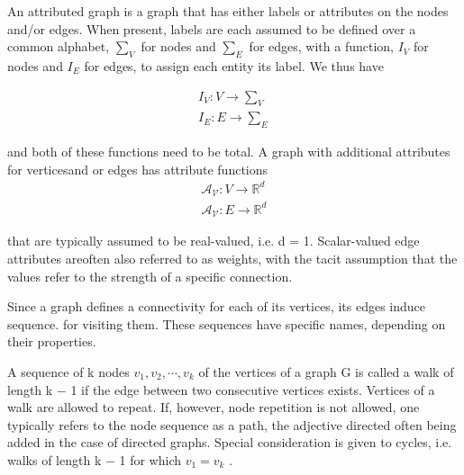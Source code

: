      \begin{mydef}
        {\rm{An attributed graph}} is a graph that has either labels or attributes on the nodes and/or edges. When present, labels are each assumed to be defined
        over a common alphabet, $ \sum_V $ for nodes and $\sum_E$ for edges, with a function, $I_V$ for nodes and $I_E$ for edges, to assign each entity its label. We thus have 
        
        \begin{equation}
            \textstyle 
            \begin{split}
                I_{V} : V \longrightarrow \textstyle  \sum_{V} \\
                I_{E} : E \longrightarrow \textstyle  \sum_{E} 
            \end{split}
        \end{equation}

        and both of these functions need to be total. A graph with additional attributes for verticesand or edges has attribute functions
        \begin{equation}
            \textstyle 
            \begin{split}
                \mathcal{A_{V}}  : V \longrightarrow \textstyle  \mathbb{R}^{d} \\
                \mathcal{A_{V}} : E \longrightarrow \textstyle  \mathbb{  R } ^{d} 
            \end{split}
        \end{equation}

        that are typically assumed to be real-valued, i.e. d = 1. Scalar-valued edge attributes areoften also referred to as weights, with the tacit assumption that the values refer to the strength of a specific connection.

        Since a graph defines a connectivity for each of its vertices, its edges induce sequence. for visiting them. These sequences have specific names, depending on their properties.
     \end{mydef}

     \begin{mydef}
        A sequence of k nodes  $ v_1 , v_2 , \cdots , v_k $ of the vertices of a graph G is called a walk of length k − 1 if the edge between two consecutive vertices exists.
        Vertices of a walk are allowed to repeat. 
        If, however, node repetition is not allowed, one typically refers to the node sequence as a path, the
        adjective directed often being added in the case of directed graphs. 
        Special consideration is given to cycles, i.e. walks of length k − 1 for which $v_1 = v_k$ .
     \end{mydef}

